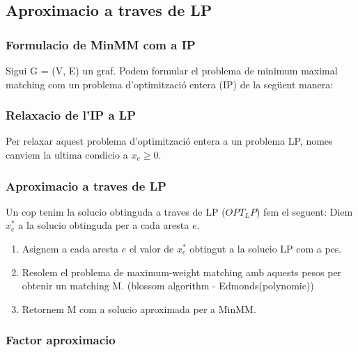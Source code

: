 \subsection{Aproximacio a traves de LP}
\subsubsection{Formulacio de MinMM com a IP}
Sigui G = (V, E) un graf. Podem formular el problema de minimum maximal matching com un problema d'optimització entera (IP) de la següent manera:

\begin{abstract}
\[
\begin{aligned}
\text{Minimitza:}\quad & \sum_{e\in E} x_e \\
\text{S.t.:}\quad & \sum_{i \in {\delta(e)}} {x_i} \ge 1 \quad &&\forall e\in E,\\
& x_e \in \{0,1\} \quad &&\forall e\in E.
\end{aligned}
\]

On: $x_e$ indica si l'aresta $e$ pertany a l'edge-dominating set i $\delta(e)$ són les arestes adjacents a $e$.
En la condicio 1 garantim que cada aresta estigui coberta per una aresta en el conjunt final.
\end{abstract}
\subsubsection{Relaxacio de l'IP a LP}
Per relaxar aquest problema d'optimització entera a un problema LP, nomes canviem la ultima condicio a $x_e \ge 0$.
\subsubsection{Aproximacio a traves de LP}
Un cop tenim la solucio obtinguda a traves de LP ($OPT_LP$) fem el seguent:
Diem $x^*_e$ a la solucio obtinguda per a cada aresta $e$.
\begin{enumerate}
    \item Asignem a cada aresta $e$ el valor de $x^*_e$ obtingut a la solucio LP com a pes.
    \item Resolem el problema de maximum-weight matching amb aquests pesos per obtenir un matching M. (blossom algorithm - Edmonds(polynomic))
    \item Retornem M com a solucio aproximada per a MinMM.
\end{enumerate}

\subsubsection{Factor aproximacio}

